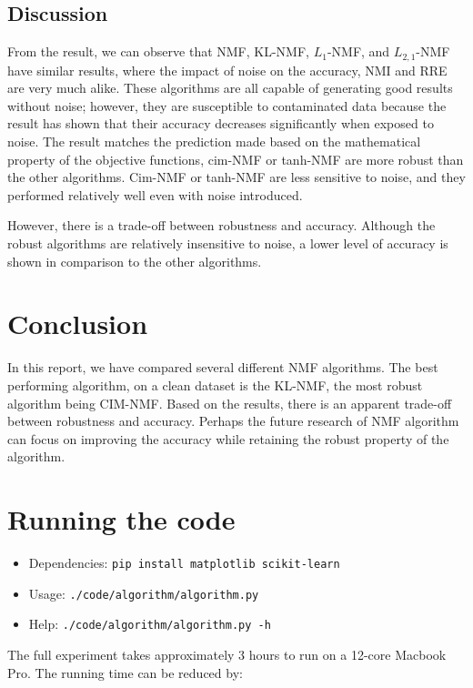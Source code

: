 \documentclass{article} %
\begin{document}
\subsection{Discussion}
From the result, we can observe that NMF, KL-NMF, $L_1$-NMF, and $L_{2,1}$-NMF have similar results, where the impact of noise on the accuracy, NMI and RRE are very much alike. These algorithms are all capable of generating good results without noise; however, they are susceptible to contaminated data because the result has shown that their accuracy decreases significantly when exposed to noise. The result matches the prediction made based on the mathematical property of the objective functions, cim-NMF or tanh-NMF are more robust than the other algorithms. Cim-NMF or tanh-NMF are less sensitive to noise, and they performed relatively well even with noise introduced.

However, there is a trade-off between robustness and accuracy. Although the robust algorithms are relatively insensitive to noise, a lower level of accuracy is shown in comparison to the other algorithms. 

\section{Conclusion}
In this report, we have compared several different NMF algorithms. The best performing algorithm, on a clean dataset is the KL-NMF, the most robust algorithm being CIM-NMF. Based on the results, there is an apparent trade-off between robustness and accuracy. Perhaps the future research of NMF algorithm can focus on improving the accuracy while retaining the robust property of the algorithm.

\printbibliography\appendix

\section{Running the code}
\begin{itemize}
\item Dependencies: \texttt{pip install matplotlib scikit-learn}
\item Usage: \texttt{./code/algorithm/algorithm.py}
\item Help: \texttt{./code/algorithm/algorithm.py -h}
\end{itemize}

The full experiment takes approximately 3 hours to run on a 12-core Macbook Pro. The running time can be reduced by:
\end{document}
